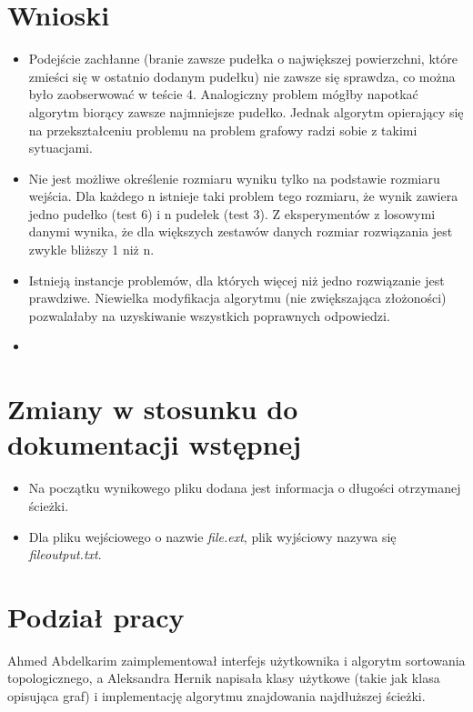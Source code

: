 \documentclass{article}
\begin{document}
\section{Wnioski}
\begin{itemize}
\item Podejście zachłanne (branie zawsze pudełka o największej powierzchni, które zmieści się w ostatnio dodanym pudełku) nie zawsze się sprawdza, co można było zaobserwować w teście 4. Analogiczny problem mógłby napotkać algorytm biorący zawsze najmniejsze pudełko. Jednak algorytm opierający się na przekształceniu problemu na problem grafowy radzi sobie z takimi sytuacjami.
\item Nie jest możliwe określenie rozmiaru wyniku tylko na podstawie rozmiaru wejścia. Dla każdego n istnieje taki problem tego rozmiaru, że wynik zawiera jedno pudełko (test 6) i n pudełek (test 3). Z eksperymentów z losowymi danymi wynika, że dla większych zestawów danych rozmiar rozwiązania jest zwykle bliższy 1 niż n.
\item Istnieją instancje problemów, dla których więcej niż jedno rozwiązanie jest prawdziwe. Niewielka modyfikacja algorytmu (nie zwiększająca złożoności) pozwalałaby na uzyskiwanie wszystkich poprawnych odpowiedzi.
\item 
\end{itemize}

\section{Zmiany w stosunku do dokumentacji wstępnej}
\begin{itemize}
\item Na początku wynikowego pliku dodana jest informacja o długości otrzymanej ścieżki.
\item Dla pliku wejściowego o nazwie \textit{file.ext}, plik wyjściowy nazywa się \textit{file\textunderscore output.txt}.
\end{itemize}

\section{Podział pracy}
Ahmed Abdelkarim zaimplementował interfejs użytkownika i algorytm sortowania topologicznego, a Aleksandra Hernik napisała klasy użytkowe (takie jak klasa opisująca graf) i implementację algorytmu znajdowania najdłuższej ścieżki.
\end{document}
